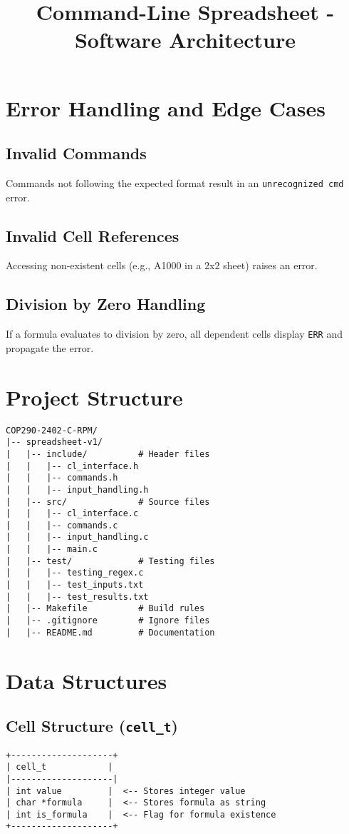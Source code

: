 \documentclass[a4paper,12pt]{article}
\begin{document}
\section{Error Handling and Edge Cases}
\subsection{Invalid Commands}
Commands not following the expected format result in an \texttt{unrecognized cmd} error.

\subsection{Invalid Cell References}
Accessing non-existent cells (e.g., A1000 in a 2x2 sheet) raises an error.

\subsection{Division by Zero Handling}
If a formula evaluates to division by zero, all dependent cells display \texttt{ERR} and propagate the error.

\title{Command-Line Spreadsheet - Software Architecture}
\author{}
\date{}
\maketitle

\section{Project Structure}
\begin{verbatim}
COP290-2402-C-RPM/
|-- spreadsheet-v1/
|   |-- include/          # Header files
|   |   |-- cl_interface.h
|   |   |-- commands.h
|   |   |-- input_handling.h
|   |-- src/              # Source files
|   |   |-- cl_interface.c
|   |   |-- commands.c
|   |   |-- input_handling.c
|   |   |-- main.c
|   |-- test/             # Testing files
|   |   |-- testing_regex.c
|   |   |-- test_inputs.txt
|   |   |-- test_results.txt
|   |-- Makefile          # Build rules
|   |-- .gitignore        # Ignore files
|   |-- README.md         # Documentation
\end{verbatim}

\section{Data Structures}

\subsection{Cell Structure (\texttt{cell\_t})}
\begin{verbatim}
+--------------------+
| cell_t            |
|--------------------|
| int value         |  <-- Stores integer value
| char *formula     |  <-- Stores formula as string
| int is_formula    |  <-- Flag for formula existence
+--------------------+
\end{verbatim}
\end{document}
